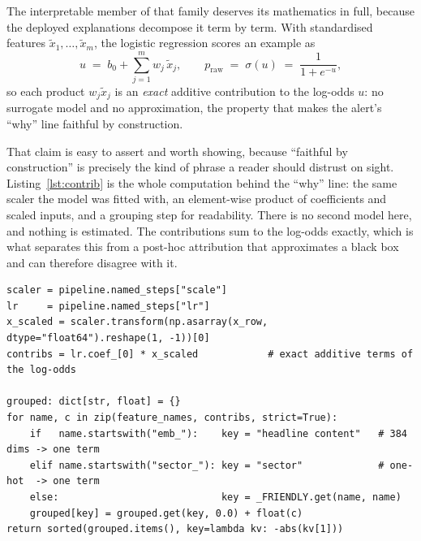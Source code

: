 The interpretable member of that family deserves its mathematics in full, because the deployed
explanations decompose it term by term. With standardised features $\tilde{x}_1,\dots,\tilde{x}_m$, the
logistic regression scores an example as
\begin{equation}
u \;=\; b_0 + \sum_{j=1}^{m} w_j\,\tilde{x}_j,
\qquad
p_{\text{raw}} \;=\; \sigma(u) \;=\; \frac{1}{1+e^{-u}},
\label{eq:logistic}
\end{equation}
so each product $w_j\tilde{x}_j$ is an \emph{exact} additive contribution to the log-odds $u$: no
surrogate model and no approximation, the property that makes the alert's ``why'' line faithful by
construction.

That claim is easy to assert and worth showing, because ``faithful by construction'' is precisely the
kind of phrase a reader should distrust on sight. Listing~\ref{lst:contrib} is the whole computation
behind the ``why'' line: the same scaler the model was fitted with, an element-wise product of
coefficients and scaled inputs, and a grouping step for readability. There is no second model here,
and nothing is estimated. The contributions sum to the log-odds exactly, which is what separates this
from a post-hoc attribution that approximates a black box and can therefore disagree with it.

\begin{lstlisting}[caption={The ``why'' line. Contributions are the model's own terms, not an
approximation of them.}, label={lst:contrib}]
scaler = pipeline.named_steps["scale"]
lr     = pipeline.named_steps["lr"]
x_scaled = scaler.transform(np.asarray(x_row, dtype="float64").reshape(1, -1))[0]
contribs = lr.coef_[0] * x_scaled            # exact additive terms of the log-odds

grouped: dict[str, float] = {}
for name, c in zip(feature_names, contribs, strict=True):
    if   name.startswith("emb_"):    key = "headline content"   # 384 dims -> one term
    elif name.startswith("sector_"): key = "sector"             # one-hot  -> one term
    else:                            key = _FRIENDLY.get(name, name)
    grouped[key] = grouped.get(key, 0.0) + float(c)
return sorted(grouped.items(), key=lambda kv: -abs(kv[1]))
\end{lstlisting}

